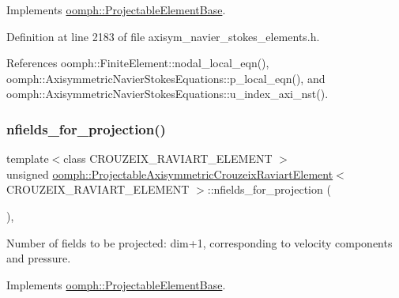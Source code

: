 Implements \hyperlink{classoomph_1_1ProjectableElementBase_ac5c27ae929ff636dc7747fe23fd4f738}{oomph\+::\+Projectable\+Element\+Base}.



Definition at line 2183 of file axisym\+\_\+navier\+\_\+stokes\+\_\+elements.\+h.



References oomph\+::\+Finite\+Element\+::nodal\+\_\+local\+\_\+eqn(), oomph\+::\+Axisymmetric\+Navier\+Stokes\+Equations\+::p\+\_\+local\+\_\+eqn(), and oomph\+::\+Axisymmetric\+Navier\+Stokes\+Equations\+::u\+\_\+index\+\_\+axi\+\_\+nst().

\mbox{\label{classoomph_1_1ProjectableAxisymmetricCrouzeixRaviartElement_a99ab07cbe191cc6d692e52d89bad0877}} 
\subsubsection{\texorpdfstring{nfields\+\_\+for\+\_\+projection()}{nfields\_for\_projection()}}
{\footnotesize\ttfamily template$<$class C\+R\+O\+U\+Z\+E\+I\+X\+\_\+\+R\+A\+V\+I\+A\+R\+T\+\_\+\+E\+L\+E\+M\+E\+NT $>$ \\
unsigned \hyperlink{classoomph_1_1ProjectableAxisymmetricCrouzeixRaviartElement}{oomph\+::\+Projectable\+Axisymmetric\+Crouzeix\+Raviart\+Element}$<$ C\+R\+O\+U\+Z\+E\+I\+X\+\_\+\+R\+A\+V\+I\+A\+R\+T\+\_\+\+E\+L\+E\+M\+E\+NT $>$\+::nfields\+\_\+for\+\_\+projection (\begin{DoxyParamCaption}{ }\end{DoxyParamCaption})\hspace{0.3cm}{\ttfamily [inline]}, {\ttfamily [virtual]}}



Number of fields to be projected\+: dim+1, corresponding to velocity components and pressure. 



Implements \hyperlink{classoomph_1_1ProjectableElementBase_a44634aa4049332a580d249c25564638c}{oomph\+::\+Projectable\+Element\+Base}.



